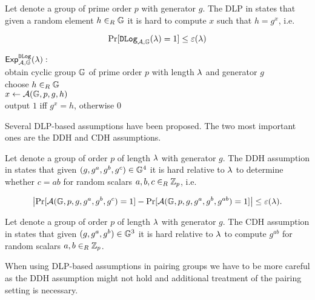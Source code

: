 \begin{definition}\label{def:dlp}
Let \GG denote a group of prime order $p$ with generator $g$.
The \ac{DLP} in \GG states that given a random element $h\in_R\mathbb{G}$ it is hard to compute $x$ such that $h=g^x$, i.e. 

\[
  \Pr[\mathtt{DLog}_{\mathcal{A},\mathbb{G}}(\lambda)=1] \leq \varepsilon(\lambda)
\]

\noindent
$\mathsf{Exp}_{\mathcal{A},\mathbb{G}}^{\mathtt{DLog}}(\lambda):$\\
\hspace*{2em} obtain cyclic group $\mathbb{G}$ of prime order $p$ with length $\lambda$ and generator $g$\\
\hspace*{2em} choose $h\in_R\mathbb{G}$\\
\hspace*{2em} $x \gets \mathcal{A}(\mathbb{G}, p, g, h)$\\
\hspace*{2em} output $1$ iff $g^x=h$, otherwise $0$\\
\eod
\end{definition}

\noindent
Several \ac{DLP}-based assumptions have been proposed.
The two most important ones are the \ac{DDH} and \ac{CDH} assumptions.

\begin{definition}\label{def:ddh}
Let \GG denote a group of order $p$ of length $\lambda$ with generator $g$.
The \ac{DDH} assumption in \GG states that given $(g,g^a,g^b,g^c)\in\mathbb{G}^4$ it is hard relative to $\lambda$ to determine whether $c=ab$ for random scalars $a,b,c\in_R\mathbb{Z}_p$, i.e. 

\[
  \left| \Pr[\mathcal{A}(\mathbb{G}, p, g, g^a, g^b, g^c)=1] - \Pr[\mathcal{A}(\mathbb{G}, p, g, g^a, g^b, g^{ab})=1] \right| \leq \varepsilon(\lambda).
\]
\eod
\end{definition}

\begin{definition}\label{def:cdh}
Let \GG denote a group of order $p$ of length $\lambda$ with generator $g$.
The \ac{CDH} assumption in \GG states that given $(g,g^a,g^b)\in\mathbb{G}^3$ it is hard relative to $\lambda$ to compute $g^{ab}$ for random scalars $a,b\in_R\mathbb{Z}_p$.
\eod
\end{definition}

\noindent
When using \ac{DLP}-based assumptions in pairing groups we have to be more careful as the \ac{DDH} assumption might not hold and additional treatment of the pairing setting is necessary.

